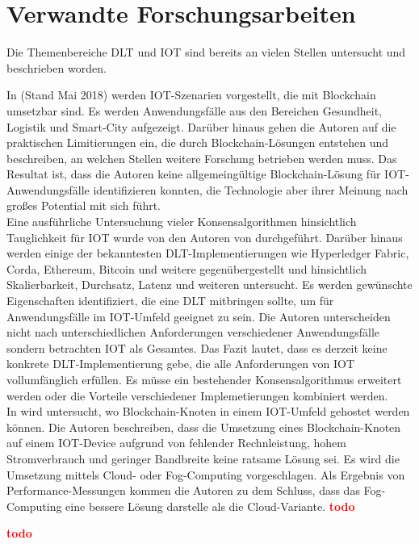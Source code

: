 \chapter{Verwandte Forschungsarbeiten}
\label{ch:relatedwork}
Die Themenbereiche \ac{DLT} und \ac{IOT} sind bereits an vielen Stellen untersucht und beschrieben worden.

In \cite{Review2018} (Stand Mai 2018) werden \ac{IOT}-Szenarien vorgestellt, die mit Blockchain umsetzbar sind. Es werden Anwendungsfälle aus den Bereichen Gesundheit, Logistik und Smart-City aufgezeigt. Darüber hinaus gehen die Autoren auf die praktischen Limitierungen ein, die durch Blockchain-Lösungen entstehen und beschreiben, an welchen Stellen weitere Forschung betrieben werden muss. Das Resultat ist, dass die Autoren keine allgemeingültige Blockchain-Lösung für \ac{IOT}-Anwendungsfälle identifizieren konnten, die Technologie aber ihrer Meinung nach großes Potential mit sich führt.\\

Eine ausführliche Untersuchung vieler Konsensalgorithmen hinsichtlich Tauglichkeit für \ac{IOT} wurde von den Autoren von \cite{Salimitari2018ASO} durchgeführt. Darüber hinaus werden einige der bekanntesten DLT-Implementierungen wie Hyperledger Fabric, Corda, Ethereum, Bitcoin und weitere gegenübergestellt und hinsichtlich Skalierbarkeit, Durchsatz, Latenz und weiteren untersucht. Es werden gewünschte Eigenschaften identifiziert, die eine \ac{DLT} mitbringen sollte, um für Anwendungsfälle im \ac{IOT}-Umfeld geeignet zu sein. Die Autoren unterscheiden nicht nach unterschiedlichen Anforderungen verschiedener Anwendungsfälle sondern betrachten \ac{IOT} als Gesamtes. Das Fazit lautet, dass es derzeit keine konkrete \ac{DLT}-Implementierung gebe, die alle Anforderungen von \ac{IOT} vollumfänglich erfüllen. Es müsse ein bestehender Konsensalgorithmus erweitert werden oder die Vorteile verschiedener Implemetierungen kombiniert werden.\\

In \cite{BaaS2016} wird untersucht, wo Blockchain-Knoten in einem \ac{IOT}-Umfeld gehostet werden können. Die Autoren beschreiben, dass die Umsetzung eines Blockchain-Knoten auf einem \ac{IOT}-Device aufgrund von fehlender Rechnleistung, hohem Stromverbrauch und geringer Bandbreite keine ratsame Lösung sei. Es wird die Umsetzung mittels Cloud- oder Fog-Computing vorgeschlagen. Als Ergebnis von Performance-Messungen kommen die Autoren zu dem Schluss, dass das Fog-Computing eine bessere Lösung darstelle als die Cloud-Variante.
\textbf{\textcolor{red}{todo}}


\textbf{\textcolor{red}{todo}}

